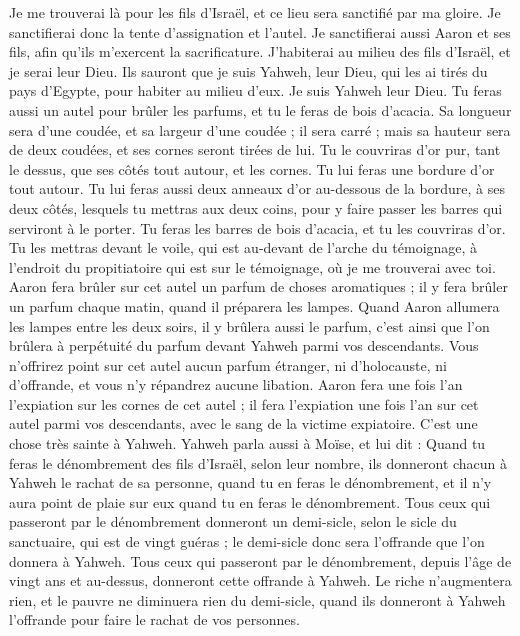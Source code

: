 \begin{multicols}{2}
Je me trouverai là pour les fils d'Israël, et ce lieu sera sanctifié par ma gloire.
Je sanctifierai donc la tente d'assignation et l'autel. Je sanctifierai aussi Aaron et ses fils, afin qu'ils m'exercent la sacrificature.
J'habiterai au milieu des fils d'Israël, et je serai leur Dieu.
Ils sauront que je suis Yahweh, leur Dieu, qui les ai tirés du pays d'Egypte, pour habiter au milieu d'eux. Je suis Yahweh leur Dieu.
\VerseOne{}Tu feras aussi un autel pour brûler les parfums, et tu le feras de bois d’acacia.
Sa longueur sera d'une coudée, et sa largeur d'une coudée ; il sera carré ; mais sa hauteur sera de deux coudées, et ses cornes seront tirées de lui.
Tu le couvriras d’or pur, tant le dessus, que ses côtés tout autour, et les cornes. Tu lui feras une bordure d’or tout autour.
Tu lui feras aussi deux anneaux d'or au-dessous de la bordure, à ses deux côtés, lesquels tu mettras aux deux coins, pour y faire passer les barres qui serviront à le porter.
Tu feras les barres de bois d’acacia, et tu les couvriras d'or.
Tu les mettras devant le voile, qui est au-devant de l'arche du témoignage, à l'endroit du propitiatoire qui est sur le témoignage, où je me trouverai avec toi.
Aaron fera brûler sur cet autel un parfum de choses aromatiques ; il y fera brûler un parfum chaque matin, quand il préparera les lampes.
Quand Aaron allumera les lampes entre les deux soirs, il y brûlera aussi le parfum, c’est ainsi que l’on brûlera à perpétuité du parfum devant Yahweh parmi vos descendants\FTNT{}.
Vous n'offrirez point sur cet autel aucun parfum étranger, ni d'holocauste, ni d'offrande, et vous n'y répandrez aucune libation.
Aaron fera une fois l'an l’expiation sur les cornes de cet autel ; il fera l’expiation une fois l'an sur cet autel parmi vos descendants, avec le sang de la victime expiatoire. C'est une chose très sainte à Yahweh.
Yahweh parla aussi à Moïse, et lui dit :
Quand tu feras le dénombrement des fils d'Israël, selon leur nombre, ils donneront chacun à Yahweh le rachat de sa personne, quand tu en feras le dénombrement, et il n'y aura point de plaie sur eux quand tu en feras le dénombrement\FTNT{}.
Tous ceux qui passeront par le dénombrement donneront un demi-sicle, selon le sicle du sanctuaire, qui est de vingt guéras ; le demi-sicle donc sera l'offrande que l'on donnera à Yahweh\FTNT{}.
Tous ceux qui passeront par le dénombrement, depuis l'âge de vingt ans et au-dessus, donneront cette offrande à Yahweh.
Le riche n'augmentera rien, et le pauvre ne diminuera rien du demi-sicle, quand ils donneront à Yahweh l'offrande pour faire le rachat de vos personnes.

\end{multicols}
